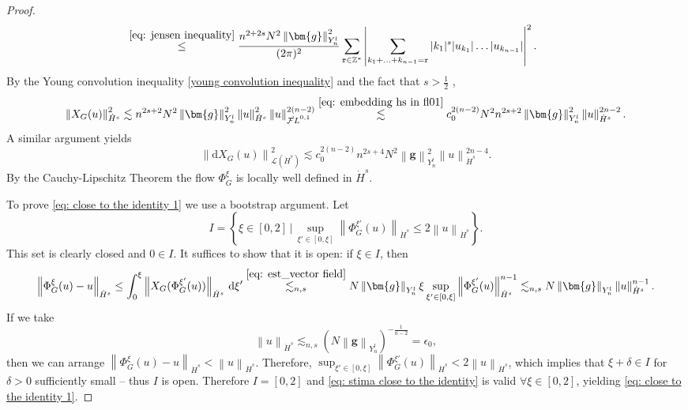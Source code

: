 \documentclass[a4paper,10pt,reqno]{article}
\theoremstyle{definition}
\theoremstyle{plain}
\theoremstyle{plain}
\theoremstyle{definition}
\theoremstyle{plain}
\theoremstyle{plain}
\theoremstyle{plain}
\theoremstyle{definition}
\theoremstyle{definition}
\newcommand{\norm}[1]{\left\lVert #1 \right\rVert}
\def \Z{\mathbb Z}
\def \FL{\mathcal{F}L}
\def \tr{\mathtt{r}}
\begin{document}
\begin{proof}
\[\begin{split}
 &\ \hspace{-0.7cm} \stackrel{\eqref{eq: jensen inequality}}{\le} \frac{n^{2+2s}N^2 \norm{\bm{g}}_{Y_n^l}^2}{(2\pi)^2} \sum_{\tr \in \Z^*} \left \lvert \sum_{k_1+\ldots+k_{n-1}=\tr} |k_1|^s |u_{k_1}|\ldots|u_{k_{n-1}}|  \right \rvert^2.
\end{split}
\]
By the Young convolution inequality \eqref{young convolution inequality} and the fact that $s > \frac{1}{2}$ ,
\begin{equation}\label{eq: est_vector field}
\norm{X_G(u)}_{\dot{H}^s}^2 \lesssim n^{2s+2} N^2 \norm{\bm{g}}_{Y_n^l}^2 \norm{u}_{\dot{H}^s}^2 \norm{u}_{\dot{\FL}^{0,1}}^{2(n-2)} \stackrel{\eqref{eq: embedding hs in fl01}} {\lesssim} c_0^{2(n-2)} N^2 n^{2s+2}  \norm{\bm{g}}_{Y_n^l}^2 \norm{u}_{\dot{H}^s}^{2n-2}.
\end{equation}
A similar argument yields
\begin{equation}
\norm{\mathrm{d} X_G(u)}_{\mathcal{L}(\dot{H}^s)}^2 \lesssim c_0^{2(n-2)} n^{2s+4} N^2 \norm{\bm{g}}_{Y_n^l}^2 \norm{u}_{\dot{H}^s}^{2n-4}.
\label{eq: stima sul differenziale}
\end{equation}
By the Cauchy-Lipschitz Theorem the flow $\Phi_G^{\xi}$ is locally well defined in $\dot{H}^s$.

\medskip

 To prove \eqref{eq: close to the identity 1} we use a bootstrap argument. 
Let 
\[
I = \left \{ \xi \in [0,2] \, | \, \sup_{\xi' \in [0,\xi]} \norm{\Phi_G^{\xi'}(u)}_{\dot{H}^s} \le 2\norm{u}_{\dot{H}^s} \right \}.
\]
This set is clearly closed and $0 \in I$. It suffices to show that it is open: if $\xi \in I$, then
\begin{equation} \label{eq: stima close to the identity}
\norm{\Phi_G^{\xi}(u)-u}_{\dot{H}^s} \le \int_0^{\xi} \norm{X_G(\Phi_G^{\xi'}(u))}_{\dot{H}^s} \, \mathrm{d} \xi' \stackrel{\eqref{eq: est_vector field}}{\lesssim_{n,s}} N \norm{\bm{g}}_{Y_n^l} \xi \sup_{\xi' \in [0,\xi]} \norm{\Phi_G^{\xi'}(u)}_{\dot{H}^s}^{n-1}  \lesssim_{n,s} N \norm{\bm{g}}_{Y_n^l} \norm{u}_{\dot{H}^s}^{n-1}.
\end{equation}
If we take 
\[
\norm{u}_{\dot{H}^s} \lesssim_{n,s} \left ( N \norm{\bm{g}}_{Y_n^l} \right )^{-\frac{1}{n-2}} = \epsilon_0,
\]
then we can arrange $\norm{\Phi_G^{\xi}(u)-u}_{\dot{H}^s}<\norm{u}_{\dot{H}^s}$.
Therefore, $\sup_{\xi' \in [0,\xi]} \norm{\Phi_G^{\xi'}(u)}_{\dot{H}^s} <2\norm{u}_{\dot{H}^s}$, which implies that $\xi+\delta\in I$ for $\delta>0$ sufficiently small -- thus $I$ is open. Therefore $I=[0,2]$ and \eqref{eq: stima close to the identity} is valid $\forall \xi \in [0,2]$, yielding \eqref{eq: close to the identity 1}. 


\end{proof}
\end{document}
